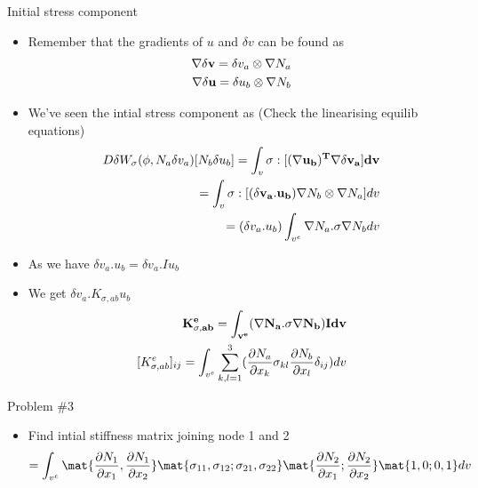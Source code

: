  
 	\begin{frame}{Initial stress component}
 		\begin{itemize}
 			\item Remember that the gradients of $u$ and $\delta v$ can be found as
 			\begin{equation}
 				\begin{aligned}
 				\nabla \delta \mathbf{v} = \delta v_a \otimes \nabla N_a \\
 				\nabla \delta \mathbf{u} = \delta u_b \otimes \nabla N_b \\
 				\end{aligned}
 			\end{equation}
 			\item We've seen the intial stress component as (Check the linearising equilib equations)
 			\begin{equation}
 			\begin{aligned}
	 			D \delta W_{\sigma}(\phi,N_a\delta v_a)[N_b \delta u_b] = \int_v \mathbf{\sigma:[(\nabla u_b)^T \nabla \delta v_a] dv} \\
	 			= \int_v \mathbf{\sigma:[(\delta v_a . u_b)} \nabla N_b \otimes \nabla N_a] dv \\
	 			= (\delta v_a. u_b) \int_{v^e} \nabla N_a .\sigma \nabla N_b dv
	 			 			\end{aligned}
 			\end{equation}
 			\item  As we have $\delta v_a.u_b = \delta v_a.Iu_b$
 			\item  We get $\delta v_a . K_{\sigma, ab} u_b$
 			\begin{equation}
 				\begin{aligned}
 				\mathbf{K^e_{\sigma,ab} = \int_{v^e} (\nabla N_a.\sigma \nabla N_b)I dv}\\
 				[K^e_{\sigma,ab}]_{ij} = \int_{v^e} \sum_{k,l=1}^{3} (\frac{\partial N_a}{\partial x_k} \sigma_{kl} \frac{\partial N_b}{\partial x_l}\delta_{ij}) dv
 				\end{aligned}
 			\end{equation}
 		\end{itemize}
 	\end{frame}
 
 
 	\begin{frame}{Problem \#3}
 		\begin{itemize}
 			\item Find intial stiffness matrix joining node 1 and 2 
 			\begin{equation}
 			[K_{\sigma,12}] = \int_{v^e} \mat{\frac{\partial N_1}{\partial x_1},\frac{\partial N_1}{\partial x_2}} \mat{\sigma_{11},\sigma_{12};\sigma_{21},\sigma_{22}}
 			\mat{\frac{\partial N_2}{\partial x_1};\frac{\partial N_2}{\partial x_2}}
 			\mat{1,0;0,1} dv
 			\end{equation}
 			
 		\end{itemize}
 	\end{frame}
 
